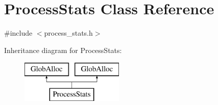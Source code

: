 \hypertarget{classProcessStats}{\section{Process\-Stats Class Reference}
\label{classProcessStats}
}


{\ttfamily \#include $<$process\-\_\-stats.\-h$>$}

Inheritance diagram for Process\-Stats\-:\begin{figure}[H]
\begin{center}
\leavevmode
\includegraphics[height=2.000000cm]{classProcessStats}
\end{center}
\end{figure}
